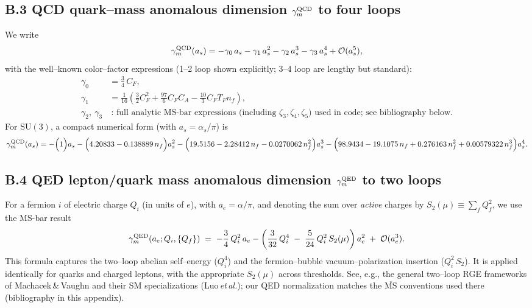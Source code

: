 \documentclass[epjc3]{svjour3}
\begin{document}
\subsection*{B.3 QCD quark–mass anomalous dimension \texorpdfstring{$\gamma_m^{\rm QCD}$}{gamma\_m(QCD)} to four loops}
We write
\[
\gamma_m^{\rm QCD}(a_s) = -\gamma_0\,a_s - \gamma_1\,a_s^2 - \gamma_2\,a_s^3 - \gamma_3\,a_s^4 + \mathcal{O}(a_s^5),
\]
with the well–known color–factor expressions (1–2 loop shown explicitly; 3–4 loop are lengthy but standard):
\begin{align*}
\gamma_0 &= \tfrac{3}{4}\,C_F,\\[2pt]
\gamma_1 &= \tfrac{1}{16}\!\left(\tfrac{3}{2}C_F^2 + \tfrac{97}{6} C_F C_A - \tfrac{10}{3} C_F T_F n_f\right),\\[2pt]
\gamma_2,\ \gamma_3 &\ \text{: full analytic MS-bar expressions (including $\zeta_3,\zeta_4,\zeta_5$) used in code; see bibliography below.}
\end{align*}
For $\mathrm{SU}(3)$, a compact numerical form (with $a_s=\alpha_s/\pi$) is
\[
\gamma_m^{\rm QCD}(a_s) =
-\Big(1\Big)a_s
-\Big(4.20833 - 0.138889\,n_f\Big)a_s^2
-\Big(19.5156 - 2.28412\,n_f - 0.0270062\,n_f^2\Big)a_s^3
-\Big(98.9434 - 19.1075\,n_f + 0.276163\,n_f^2 + 0.00579322\,n_f^3\Big)a_s^4.
\]

\subsection*{B.4 QED lepton/quark mass anomalous dimension \texorpdfstring{$\gamma_m^{\rm QED}$}{gamma\_m(QED)} to two loops}
For a fermion $i$ of electric charge $Q_i$ (in units of $e$), with $a_e=\alpha/\pi$, and denoting the sum over \emph{active} charges by $\displaystyle S_2(\mu)\equiv\sum_f Q_f^2$, we use the MS-bar result
\[
\gamma_m^{\rm QED}(a_e;Q_i,\{Q_f\}) \;=\;
-\frac{3}{4}\,Q_i^2\,a_e
-\left(\frac{3}{32}\,Q_i^4 \;-\; \frac{5}{24}\,Q_i^2\,S_2(\mu)\right)a_e^2
\;+\; \mathcal{O}(a_e^3).
\]
This formula captures the two–loop abelian self–energy ($Q_i^4$) and the fermion–bubble vacuum–polarization insertion ($Q_i^2\,S_2$). It is applied identically for quarks and charged leptons, with the appropriate $S_2(\mu)$ across thresholds. See, e.g., the general two–loop RGE frameworks of Machacek\,\&\,Vaughn and their SM specializations (Luo\,\emph{et\,al.}); our QED normalization matches the $\overline{\mathrm{MS}}$ conventions used there (bibliography in this appendix).
\end{document}
